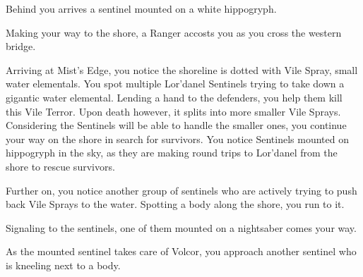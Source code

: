 Behind you arrives a sentinel mounted on a white hippogryph.





Making your way to the shore, a Ranger accosts you as you cross the western bridge.



Arriving at Mist's Edge, you notice the shoreline is dotted with Vile Spray, small water elementals. You spot multiple Lor'danel Sentinels trying to take down a gigantic water elemental. Lending a hand to the defenders, you help them kill this Vile Terror. Upon death however, it splits into more smaller Vile Sprays. Considering the Sentinels will be able to handle the smaller ones, you continue your way on the shore in search for survivors. You notice Sentinels mounted on hippogryph in the sky, as they are making round trips to Lor'danel from the shore to rescue survivors.

Further on, you notice another group of sentinels who are actively trying to push back Vile Sprays to the water. Spotting a body along the shore, you run to it.


Signaling to the sentinels, one of them mounted on a nightsaber comes your way.




As the mounted sentinel takes care of Volcor, you approach another sentinel who is kneeling next to a body.

